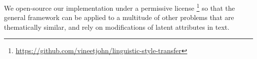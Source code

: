 We open-source our implementation under a permissive license \footnote{\url{https://github.com/vineetjohn/linguistic-style-transfer}} so that the general framework can be applied to a multitude of other problems that are thematically similar, and rely on modifications of latent attributes in text.
